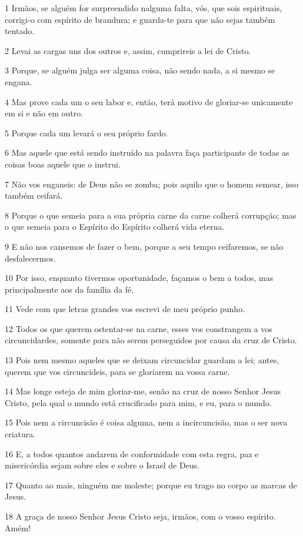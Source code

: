 \par 1 Irmãos, se alguém for surpreendido nalguma falta, vós, que sois espirituais, corrigi-o com espírito de brandura; e guarda-te para que não sejas também tentado.
\par 2 Levai as cargas uns dos outros e, assim, cumprireis a lei de Cristo.
\par 3 Porque, se alguém julga ser alguma coisa, não sendo nada, a si mesmo se engana.
\par 4 Mas prove cada um o seu labor e, então, terá motivo de gloriar-se unicamente em si e não em outro.
\par 5 Porque cada um levará o seu próprio fardo.
\par 6 Mas aquele que está sendo instruído na palavra faça participante de todas as coisas boas aquele que o instrui.
\par 7 Não vos enganeis: de Deus não se zomba; pois aquilo que o homem semear, isso também ceifará.
\par 8 Porque o que semeia para a sua própria carne da carne colherá corrupção; mas o que semeia para o Espírito do Espírito colherá vida eterna.
\par 9 E não nos cansemos de fazer o bem, porque a seu tempo ceifaremos, se não desfalecermos.
\par 10 Por isso, enquanto tivermos oportunidade, façamos o bem a todos, mas principalmente aos da família da fé.
\par 11 Vede com que letras grandes vos escrevi de meu próprio punho.
\par 12 Todos os que querem ostentar-se na carne, esses vos constrangem a vos circuncidardes, somente para não serem perseguidos por causa da cruz de Cristo.
\par 13 Pois nem mesmo aqueles que se deixam circuncidar guardam a lei; antes, querem que vos circuncideis, para se gloriarem na vossa carne.
\par 14 Mas longe esteja de mim gloriar-me, senão na cruz de nosso Senhor Jesus Cristo, pela qual o mundo está crucificado para mim, e eu, para o mundo.
\par 15 Pois nem a circuncisão é coisa alguma, nem a incircuncisão, mas o ser nova criatura.
\par 16 E, a todos quantos andarem de conformidade com esta regra, paz e misericórdia sejam sobre eles e sobre o Israel de Deus.
\par 17 Quanto ao mais, ninguém me moleste; porque eu trago no corpo as marcas de Jesus.
\par 18 A graça de nosso Senhor Jesus Cristo seja, irmãos, com o vosso espírito. Amém!


